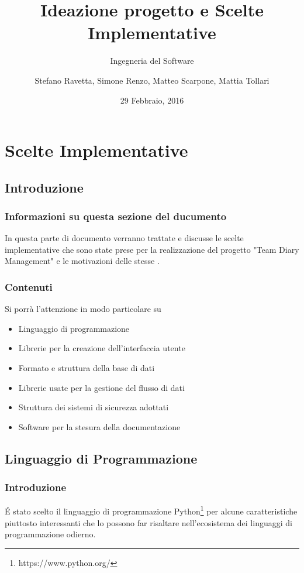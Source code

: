 \documentclass[12pt]{scrartcl}
\title{Ideazione progetto e Scelte Implementative}
\subtitle{Ingegneria del Software}
\author{Stefano Ravetta, Simone Renzo, Matteo Scarpone, Mattia Tollari}
\date{29 Febbraio, 2016}
\begin{document}
\maketitle

\section{Scelte Implementative}
\subsection{Introduzione}	%

\subsubsection{Informazioni su questa sezione del ducumento}
In questa parte di documento verranno trattate e discusse le scelte
implementative che sono state prese per la realizzazione del progetto "Team Diary Management"
e le motivazioni delle stesse .

\subsubsection{Contenuti}
Si porr\`a l'attenzione in modo particolare su
\begin{itemize}
    \item Linguaggio di programmazione
    \item Librerie per la creazione dell'interfaccia utente
    \item Formato e struttura della base di dati
    \item Librerie usate per la gestione del flusso di dati
    \item Struttura dei sistemi di sicurezza adottati
    \item Software per la stesura della documentazione
\end{itemize}

\subsection{Linguaggio di Programmazione}
\subsubsection{Introduzione}
\'E stato scelto il linguaggio di programmazione Python\footnote{https://www.python.org/} per alcune caratteristiche
piuttosto interessanti che lo possono far risaltare nell'ecosistema dei linguaggi di programmazione odierno.
\end{document}
